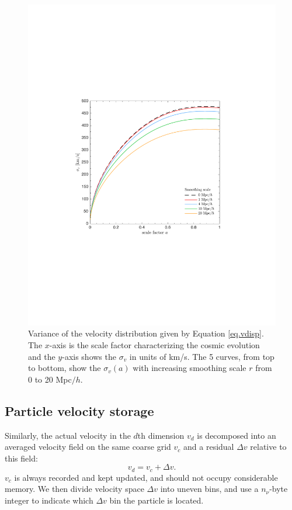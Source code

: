 \documentclass[10pt,twocolumn,reprint]{emulateapj}
\begin{document}
\begin{figure}
\centering
  \includegraphics[width=1\linewidth]{f1}
 \caption{Variance of the velocity distribution given by Equation \ref{eq.vdisp}. The $x$-axis is the scale factor characterizing the cosmic evolution and the $y$-axis shows the $\sigma_v$ in units of km/s. The 5 curves, from top to bottom, show the $\sigma_v(a)$ with increasing smoothing scale $r$ from 0 to 20 Mpc$/h$.}
\label{fig.vdisp}
\end{figure}

\subsection{Particle velocity storage}\label{ss.velocity}
Similarly, the actual velocity in the $d$th dimension $v_d$ is decomposed into an averaged velocity field on the same coarse grid $v_c$ and a residual $\Delta v$ relative to this field:
\begin{equation}\label{eq.deltav}
	v_d=v_c+\Delta v.
\end{equation}
$v_c$ is always recorded and kept updated, and should not occupy considerable memory. We then divide velocity space $\Delta v$ into uneven bins, and use a $n_\nu$-byte integer to indicate which $\Delta v$ bin the particle is located.
\end{document}
